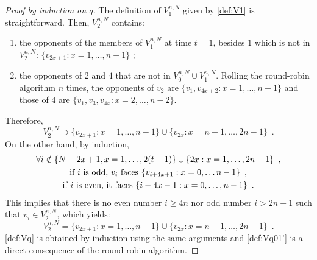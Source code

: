 \begin{proof}[Proof by induction on $q$]
The definition of $V_{1}^{n,N}$ given by \eqref{def:V1} is straightforward. Then, $V_{2}^{n,N}$ contains:
\begin{enumerate}[-]
\item  the opponents of the members of $V_{1}^{n,N}$ at time $t=1$, besides $1$ which is not in $V_{2}^{n,N}$: $\{v_{2x+1} : x=1,\ldots,n-1\}$ ;
\item the opponents of $2$ and $4$ that are not in $V_{0}^{n,N}\cup V_{1}^{n,N}$. Rolling the round-robin algorithm $n$ times,  the opponents of $v_2$ are $\{v_1,v_{4x+2} : x=1,\ldots,n-1\}$ and those of $4$ are $\{v_1,v_3,v_{4x} : x=2,\ldots,n-2\}$. 
\end{enumerate}
Therefore, 
\[
V_{2}^{n,N}\supset \{v_{2x+1} : x=1,\ldots,n-1\}\cup\{v_{2x} : x=n+1,\ldots,2n-1\}\enspace.
\]
On the other hand, by induction,  
\begin{gather}
\notag\forall i\notin \{N-2x+1, x=1,\ldots,2(t-1)\}\cup \{2x : x=1,\ldots, 2n-1\}\enspace,\\
\notag\text{if }i \text{ is odd, $v_i$ faces }\{v_{i+4x+1} : x=0,\ldots n-1\}\enspace,\\
\label{eq:Opponents}\text{if }i \text{ is even, it faces }\{i-4x-1 : x=0,\ldots,n-1\}\enspace.
\end{gather}
This implies that there is no even number $i\ge 4n$ nor odd number $i>2n-1$ such that $v_i\in V_{2}^{n,N}$, which yields:
\begin{equation*}
 V_{2}^{n,N}= \{v_{2x+1} : x=1,\ldots,n-1\}\cup\{v_{2x} : x=n+1,\ldots,2n-1\}\enspace.
\end{equation*}
\eqref{def:Vq} is obtained by induction using the same arguments and
\eqref{def:Vq01'} is a direct consequence of the round-robin algorithm. 
\end{proof}
%
